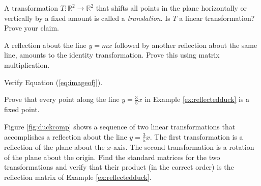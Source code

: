 \documentclass{ximera}
\newcommand{\RR}{\mathbb{R}}
\newcommand{\dfn}{\textit}
\begin{document}
\begin{problem}
A transformation $T:\RR^2\rightarrow \RR^2$ that shifts all points in the plane horizontally or vertically by a fixed amount is called a \dfn{translation}.  Is $T$ a linear transformation?  Prove your claim.
\end{problem}

\begin{problem} A reflection about the line $y=mx$ followed by another reflection about the same line, amounts to the identity transformation.  Prove this using matrix multiplication.
\end{problem}

\begin{problem}
Verify Equation (\ref{eq:imageofj}).
\end{problem}

\begin{problem}\label{prob:fixedpoint}
Prove that every point along the line $y=\frac{3}{5}x$ in Example \ref{ex:reflectedduck} is a fixed point.
\end{problem}

\begin{problem}
Figure \ref{fig:duckcomp} shows a sequence of two linear transformations that accomplishes a reflection about the line $y=\frac{3}{5}x$.  The first transformation is a reflection of the plane about the $x$-axis.  The second transformation is a rotation of the plane about the origin.  Find the standard matrices for the two transformations and verify that their product (in the correct order) is the reflection matrix of Example \ref{ex:reflectedduck}.
\end{problem}
\end{document}
